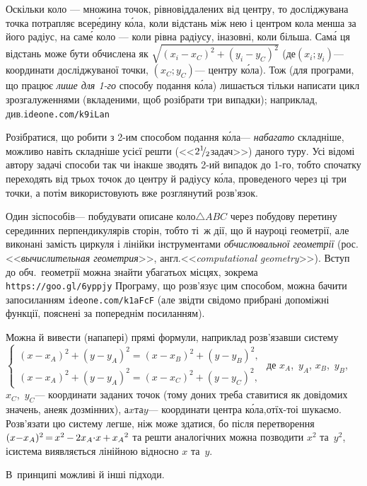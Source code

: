\Tutorial	Оскільки коло --- множина точок, рівновіддалених від центру, то досліджувана точка потрапляє всер\'{е}дину к\'{о}ла, коли відстань між нею і центром кола менша за його радіус, на сам\'{е} коло --- коли рівна радіусу, і\nolinebreak[3] назовні, коли більша. Сам\'{а} ця відстань може бути обчислена як $\sqrt{(x_i-x_C)^2+(y_i-y_C)^2}$ (де\nolinebreak[3] $(x_i; y_i)$\nolinebreak[3] --- координати досліджуваної точки, $(x_C; y_C)$\nolinebreak[3] --- центру к\'{о}ла). Тож (для програми, що працює \emph{лише для \mbox{1-го}} способу подання к\'{о}ла) лишається тільки написати цикл з\nolinebreak[3] розгалуженнями (вкладеними, щоб розібрати три випадки); наприклад, див.\nolinebreak[3] \verb"ideone.com/k9iLan"

Розібратися, що робити з \mbox{2-им} способом подання к\'{о}ла\nolinebreak[3] --- \emph{набагато} складніше, можливо навіть складніше усієї решти 
(<<${2\lefteqn{{}^{1}}{}^{\,}\lefteqn{/}{}_{\,\,\,2}}$\nolinebreak[3] задач>>) даного туру. Усі відомі автору задачі способи так чи інакше зводять \mbox{2-ий} випадок до \mbox{1-го}, тобто спочатку переходять від трьох точок до центру й радіусу к\'{о}ла, проведеного через ці три точки, а потім використовують вже розглянутий розв'язок.

Один зі\nolinebreak[3] способів\nolinebreak[3] --- побудувати описане коло\nolinebreak[2] $\triangle{}ABC$ через побудову перетину серединних перпендикулярів сторін, тобто ті~ж дії, що й на\nolinebreak[3] уроці геометрії, але виконані замість циркуля і лінійки інструментами \emph{обчислювальної геометрії} (рос.\nolinebreak[2] <<\emph{вычислительная геометрия}>>, англ.\nolinebreak[2] <<\emph{computational geometry}>>). Вступ до обч.~геометрії можна знайти у\nolinebreak[3] багатьох місцях, зокрема \verb"https://goo.gl/6yppjy"\hspace{0.5em plus 1em} Програму, що розв'язує цим способом, можна бачити за\nolinebreak[3] посиланням \verb"ideone.com/k1aFcF" (але звідти свідомо прибрані допоміжні функції, пояснені за попереднім посиланням).

Можна й вивести (на\nolinebreak[3] папері) прямі формули, наприклад розв'язавши систему
$\left\{
\begin{array}{c}
(x{-}x_A)^2+(y{-}y_A)^2 = (x{-}x_B)^2+(y{-}y_B)^2,\\
(x{-}x_A)^2+(y{-}y_A)^2 = (x{-}x_C)^2+(y{-}y_C)^2,
\end{array}
\right.$
де $x_A$,~$y_A$, $x_B$,~$y_B$, $x_C$,~$y_C$\nolinebreak[3] --- координати заданих точок (тому до\nolinebreak[3] них треба ставитися як до\nolinebreak[3] відомих значень, а\nolinebreak[3] не\nolinebreak[3] як до\nolinebreak[3] змінних), а\nolinebreak[3] $x$\nolinebreak[1] та\nolinebreak[3] $y$\nolinebreak[3] --- координати центра к\'{о}ла,\linebreak[1] от\nolinebreak[1] їх-то\nolinebreak[1] і шукаємо. Розв'язати цю систему легше, ніж може здатися, бо після перетворення ${(x{-}x_A)^2}\dib{{=}}x^2\dib{{-}}2x_A{\cdot}x\dib{{+}}{x_A}^2$ та решти аналогічних можна позводити $x^2$ та~$y^2$, і\nolinebreak[3] система виявляється лінійною відносно $x$ та~$y$.

В~принципі можливі й інші підходи.

